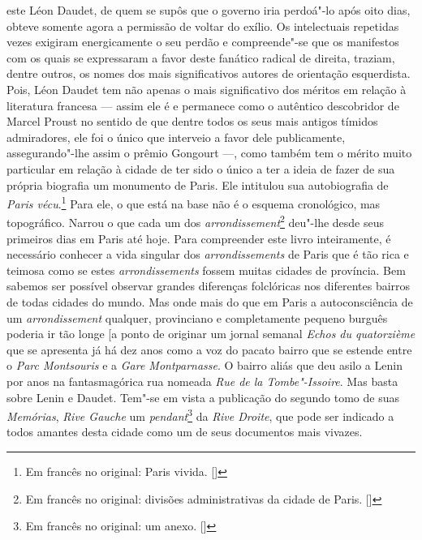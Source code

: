 este Léon Daudet, de quem se supôs que o governo iria perdoá"-lo após
oito dias, obteve somente agora a permissão de voltar do exílio. Os
intelectuais repetidas vezes exigiram energicamente o seu perdão e
compreende"-se que os manifestos com os quais se expressaram a favor
deste fanático radical de direita, traziam, dentre outros, os nomes dos
mais significativos autores de orientação esquerdista. Pois, Léon Daudet
tem não apenas o mais significativo dos méritos em relação à literatura
francesa --- assim ele é e permanece como o autêntico descobridor de
Marcel Proust no sentido de que dentre todos os seus mais antigos
tímidos admiradores, ele foi o único que interveio a favor dele
publicamente, assegurando"-lhe assim o prêmio Gongourt ---, como também
tem o mérito muito particular em relação à cidade de ter sido o único a
ter a ideia de fazer de sua própria biografia um monumento de Paris. Ele
intitulou sua autobiografia de \emph{Paris vécu}.\footnote{Em francês no original: Paris
  vivida. []} Para ele, o que está na base não é o esquema cronológico,
mas topográfico. Narrou o que cada um dos
\emph{arrondissement}\footnote{Em francês no original: divisões
  administrativas da cidade de Paris. []} deu"-lhe desde seus primeiros dias
em Paris até hoje. Para compreender este livro inteiramente, é
necessário conhecer a vida singular dos \emph{arrondissements} de Paris
que é tão rica e teimosa como se estes \emph{arrondissements} fossem
muitas cidades de província. Bem sabemos ser possível observar grandes
diferenças folclóricas nos diferentes bairros de todas cidades do mundo.
Mas onde mais do que em Paris a autoconsciência de um
\emph{arrondissement} qualquer, provinciano e completamente pequeno
burguês poderia ir tão longe {[}a ponto de originar um jornal semanal
\emph{Echos du quatorzième} que se apresenta já há dez anos como a voz
do pacato bairro que se estende entre o \emph{Parc Montsouris} e a
\emph{Gare Montparnasse}. O bairro aliás que deu asilo a Lenin por anos
na fantasmagórica rua nomeada \emph{Rue de la Tombe"-Issoire}. Mas basta
sobre Lenin e Daudet. Tem"-se em vista a publicação do segundo tomo de
suas \emph{Memórias}, \emph{Rive Gauche} um \emph{pendant}\footnote{Em francês no original: um anexo. []} da \emph{Rive Droite}, que pode ser
indicado a todos amantes desta cidade como um de seus documentos mais
vivazes.

